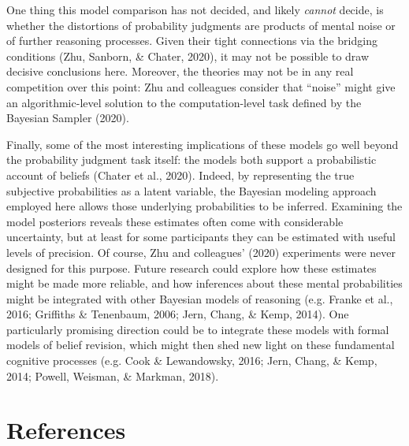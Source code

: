 \documentclass[
  english,
  man,floatsintext]{apa6}
\begin{document}
One thing this model comparison has not decided, and likely \emph{cannot} decide, is whether the distortions of probability judgments are products of mental noise or of further reasoning processes. Given their tight connections via the bridging conditions (Zhu, Sanborn, \& Chater, 2020), it may not be possible to draw decisive conclusions here. Moreover, the theories may not be in any real competition over this point: Zhu and colleagues consider that ``noise'' might give an algorithmic-level solution to the computation-level task defined by the Bayesian Sampler (2020).

Finally, some of the most interesting implications of these models go well beyond the probability judgment task itself: the models both support a probabilistic account of beliefs (Chater et al., 2020). Indeed, by representing the true subjective probabilities as a latent variable, the Bayesian modeling approach employed here allows those underlying probabilities to be inferred. Examining the model posteriors reveals these estimates often come with considerable uncertainty, but at least for some participants they can be estimated with useful levels of precision. Of course, Zhu and colleagues' (2020) experiments were never designed for this purpose. Future research could explore how these estimates might be made more reliable, and how inferences about these mental probabilities might be integrated with other Bayesian models of reasoning (e.g. Franke et al., 2016; Griffiths \& Tenenbaum, 2006; Jern, Chang, \& Kemp, 2014). One particularly promising direction could be to integrate these models with formal models of belief revision, which might then shed new light on these fundamental cognitive processes (e.g. Cook \& Lewandowsky, 2016; Jern, Chang, \& Kemp, 2014; Powell, Weisman, \& Markman, 2018).

\newpage

\hypertarget{references}{%
\section*{References}\label{references}}
\end{document}
